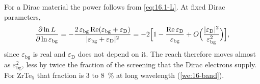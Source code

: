For a Dirac material the power follows from \cref{eq:16.1-L}. At fixed Dirac parameters,
\begin{equation}
  \frac{\partial\ln L}{\partial\ln\varepsilon_{\mathrm{bg}}} = -\frac{2\,\varepsilon_{\mathrm{bg}}\operatorname{Re}(\varepsilon_{\mathrm{bg}} + \varepsilon_{\mathrm{D}})}{|\varepsilon_{\mathrm{bg}} + \varepsilon_{\mathrm{D}}|^2} = -2\Bigl[1 - \frac{\operatorname{Re}\varepsilon_{\mathrm{D}}}{\varepsilon_{\mathrm{bg}}} + O\Bigl(\frac{|\varepsilon_{\mathrm{D}}|^2}{\varepsilon_{\mathrm{bg}}^2}\Bigr)\Bigr] ,
  \label{eq:16.9-power}
\end{equation}
since $\varepsilon_{\mathrm{bg}}$ is real and $\varepsilon_{\mathrm{D}}$ does not depend on it. The reach therefore moves almost as $\varepsilon_{\mathrm{bg}}^2$, less by twice the fraction of the screening that the Dirac electrons supply. For ZrTe$_5$ that fraction is 3 to \SI{8}{\percent} at long wavelength (\cref{we:16-band}).

